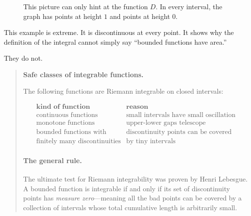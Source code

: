 \begin{figure}[h]
\centering
{}
\caption{This picture can only hint at the function \(D\).  In every interval, the graph has points at height \(1\) and points at height \(0\).}
\label{fig:dirichlet-function-not-integrable}
\end{figure}

This example is extreme.  It is discontinuous at every point.  It shows why the
definition of the integral cannot simply say ``bounded functions have area.''

They do not.

\begin{quote}
\textbf{Safe classes of integrable functions.}

The following functions are Riemann integrable on closed intervals:

\[
\begin{array}{c|c}
\textbf{kind of function} & \textbf{reason} \\ \hline
\text{continuous functions} & \text{small intervals have small oscillation} \\
\text{monotone functions} & \text{upper-lower gaps telescope} \\
\text{bounded functions with} & \text{discontinuity points can be covered} \\
\text{finitely many discontinuities} & \text{by tiny intervals}
\end{array}
\]
\paragraph{The general rule.}
The ultimate test for Riemann integrability was proven by Henri Lebesgue. A bounded function is integrable if and only if its set of discontinuity points has \emph{measure zero}---meaning all the bad points can be covered by a collection of intervals whose total cumulative length is arbitrarily small.
\end{quote}

